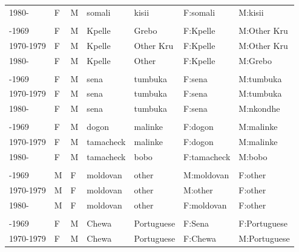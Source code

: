 \begin{ThreePartTable}
\begin{longtable}[t]{lllllll}
\hspace{1em}1980- & F & M & somali & kisii & F:somali & M:kisii\\
\addlinespace[0.3em]
\multicolumn{7}{l}{\textbf{Liberia}}\\
\hspace{1em}-1969 & F & M & Kpelle & Grebo & F:Kpelle & M:Other Kru\\
\hspace{1em}1970-1979 & F & M & Kpelle & Other Kru & F:Kpelle & M:Other Kru\\
\hspace{1em}1980- & F & M & Kpelle & Other & F:Kpelle & M:Grebo\\
\addlinespace[0.3em]
\multicolumn{7}{l}{\textbf{Malawi}}\\
\hspace{1em}-1969 & F & M & sena & tumbuka & F:sena & M:tumbuka\\
\hspace{1em}1970-1979 & F & M & sena & tumbuka & F:sena & M:tumbuka\\
\hspace{1em}1980- & F & M & sena & tumbuka & F:sena & M:nkondhe\\
\addlinespace[0.3em]
\multicolumn{7}{l}{\textbf{Mali}}\\
\hspace{1em}-1969 & F & M & dogon & malinke & F:dogon & M:malinke\\
\hspace{1em}1970-1979 & F & M & tamacheck & malinke & F:dogon & M:malinke\\
\hspace{1em}1980- & F & M & tamacheck & bobo & F:tamacheck & M:bobo\\
\addlinespace[0.3em]
\multicolumn{7}{l}{\textbf{Moldova}}\\
\hspace{1em}-1969 & M & F & moldovan & other & M:moldovan & F:other\\
\hspace{1em}1970-1979 & M & F & moldovan & other & M:other & F:other\\
\hspace{1em}1980- & M & F & moldovan & other & F:moldovan & F:other\\
\addlinespace[0.3em]
\multicolumn{7}{l}{\textbf{Mozambique}}\\
\hspace{1em}-1969 & F & M & Chewa & Portuguese & F:Sena & F:Portuguese\\
\hspace{1em}1970-1979 & F & M & Chewa & Portuguese & F:Chewa & M:Portuguese\\

\end{longtable}
\end{ThreePartTable}
